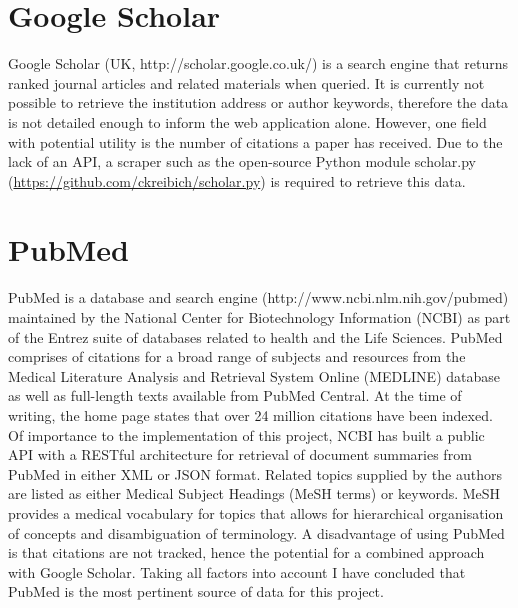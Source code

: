 \documentclass[PROP_AGutteridge_CS.tex]{subfiles}
\begin{document}
\noindent \section{Google Scholar}
Google Scholar (UK, http://scholar.google.co.uk/) is a search engine that returns ranked journal articles and related materials when queried. It is currently not possible to retrieve the institution address or author keywords, therefore the data is not detailed enough to inform the web application alone. However, one field with potential utility is the number of citations a paper has received. Due to the lack of an API, a scraper such as the open-source Python module scholar.py (\url{https://github.com/ckreibich/scholar.py}) is required to retrieve this data.

\noindent \section{PubMed}
PubMed is a database and search engine (http://www.ncbi.nlm.nih.gov/pubmed) maintained by the National Center for Biotechnology Information (NCBI) as part of the Entrez suite of databases related to health and the Life Sciences. PubMed comprises of citations for a broad range of subjects and resources from the Medical Literature Analysis and Retrieval System Online (MEDLINE) database as well as full-length texts available from PubMed Central. At the time of writing, the home page\cite{pubmed} states that over 24 million citations have been indexed. \\
\newline \noindent Of importance to the implementation of this project, NCBI has built a public API with a RESTful architecture for retrieval of document summaries from PubMed in either XML or JSON format. Related topics supplied by the authors are listed as either Medical Subject Headings (MeSH terms) or keywords. MeSH provides a medical vocabulary for topics that allows for hierarchical organisation of concepts and disambiguation of terminology\cite{mesh}. A disadvantage of using PubMed is that citations are not tracked, hence the potential for a combined approach with Google Scholar. Taking all factors into account I have concluded that PubMed is the most pertinent source of data for this project.
\end{document}
